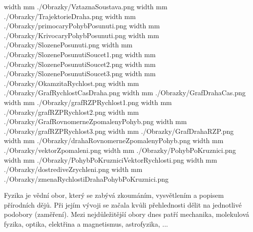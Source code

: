 %
%
%





\pdfximage width \the\SirkaOdstavce mm {./Obrazky/VztaznaSoustava.png}
\pdfximage width \the\SirkaOdstavce mm {./Obrazky/TrajektorieDraha.png}
\pdfximage width \the\SirkaOdstavce mm {./Obrazky/primocaryPohybPosunuti.png}
\pdfximage width \the\SirkaOdstavce mm {./Obrazky/KrivocaryPohybPosunuti.png}
\pdfximage width \the\SirkaOdstavce mm {./Obrazky/SlozenePosunuti.png}
\pdfximage width \the\SirkaOdstavce mm {./Obrazky/SlozenePosunutiSoucet1.png}
\pdfximage width \the\SirkaOdstavce mm {./Obrazky/SlozenePosunutiSoucet2.png}
\pdfximage width \the\SirkaOdstavce mm {./Obrazky/SlozenePosunutiSoucet3.png}
\pdfximage width \the\SirkaOdstavce mm {./Obrazky/OkamzitaRychlost.png}
\pdfximage width \the\SirkaOdstavce mm {./Obrazky/GrafRychlostCasDraha.png}
\pdfximage width \the\SirkaOdstavce mm {./Obrazky/GrafDrahaCas.png}
\pdfximage width \the\SirkaOdstavce mm {./Obrazky/grafRZPRychlost1.png}
\pdfximage width \the\SirkaOdstavce mm {./Obrazky/grafRZPRychlost2.png}
\pdfximage width \the\SirkaOdstavce mm {./Obrazky/GrafRovnomerneZpomalenyPohyb.png}
\pdfximage width \the\SirkaOdstavce mm {./Obrazky/grafRZPRychlost3.png}
\pdfximage width \the\SirkaOdstavce mm {./Obrazky/GrafDrahaRZP.png}
\pdfximage width \the\SirkaOdstavce mm {./Obrazky/drahaRovnomerneZpomalenyPohyb.png}
\pdfximage width \the\SirkaOdstavce mm {./Obrazky/vektorZpomaleni.png}
\pdfximage width \the\SirkaOdstavce mm {./Obrazky/PohybPoKruznici.png}
\pdfximage width \the\SirkaOdstavce mm {./Obrazky/PohybPoKruzniciVektorRychlosti.png}
\pdfximage width \the\SirkaOdstavce mm {./Obrazky/dostrediveZrychleni.png}
\pdfximage width \the\SirkaOdstavce mm {./Obrazky/zmenaRychlostiDrahaPohybPoKruznici.png}



\Obsah


Fyzika je vědní obor, který se zabývá zkoumáním, vysvětlením a popisem přírodních dějů. Při jejím vývoji se začala kvůli přehlednosti dělit na jednotlivé podobory (zaměření). Mezi nejdůležitější obory dnes patří mechanika, molekulová fyzika, optika, elektřina a magnetismus, astrofyzika, ...

